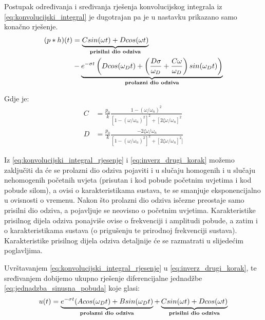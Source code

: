 Postupak određivanja i sređivanja rješenja konvolucijskog integrala iz
\eqref{eq:konvolucijski_integral} je dugotrajan pa je u nastavku prikazano samo konačno 
rješenje.
\begin{equation}
	\begin{split}
	(p*h)(t)&=\underbrace{
			Csin(\omega t)+Dcos(\omega t)
		}_{\text{\textbf{prisilni dio odziva}}}\\
		&-
		\underbrace{
			e^{-\sigma t}
				\left(
				Dcos(\omega_D t) +
					\left(
						\frac{D\sigma}{\omega_D}+\frac{C\omega}{\omega_D}
					\right)
				sin(\omega_Dt)
				\right)
		}_{\text{\textbf{prolazni dio odziva}}}
	\end{split}
    \label{eq:konvolucijski_integral_rjesenje}
\end{equation}

Gdje je:
\begin{align}
    C &= \frac{p_0}{k}\frac{1-(\omega/\omega_n)^2}
            {[1-(\omega/\omega_n)^2]^2+[2\zeta\omega/\omega_n]^2}\label{eq:koef_C}\\
    D &= \frac{p_0}{k}\frac{-2\zeta\omega/\omega_n}
            {[1-(\omega/\omega_n)^2]^2+[2\zeta\omega/\omega_n]^2]}\label{eq:koef_D}
\end{align}

Iz \eqref{eq:konvolucijski_integral_rjesenje} i \eqref{eq:inverz_drugi_korak} možemo
zaključiti da će se prolazni dio odziva pojaviti i u slučaju homogenih i u slučaju
nehomogenih početnih uvjeta (prisutan i kod pobude početnim uvjetima i kod pobude
silom), a ovisi o karakteristikama sustava,
te se smanjuje eksponencijalno u ovisnosti o vremenu. Nakon
što prolazni dio odziva isčezne preostaje samo prisilni dio odziva, a pojavljuje se
neovisno o početnim uvjetima. Karakteristike prisilnog dijela odziva ponajviše ovise
o frekvenciji i amplitudi pobude, a zatim i o karakteristikama sustava (o prigušenju
te prirodnoj frekvenciji sustava). Karakteristike prisilnog dijela odziva detaljnije će se
razmatrati u slijedećim poglavljima.

Uvrštavanjem \eqref{eq:konvolucijski_integral_rjesenje} u
\eqref{eq:inverz_drugi_korak}, te sređivanjem dobijemo ukupno rješenje
diferencijalne jednadžbe \eqref{eq:jednadzba_sinusna_pobuda} koje glasi:
\begin{equation}\label{eq:inverz_treci_korak}
	u(t)=\underbrace{
		e^{-\sigma t}(Acos(\omega_D t)+Bsin(\omega_Dt)
		}_{\text{\textbf{prolazni dio odziva}}}
		+
	     \underbrace{
		Csin(\omega t) + Dcos(\omega t)
		     }_{\text{\textbf{prisilni dio odziva}}}
\end{equation}

